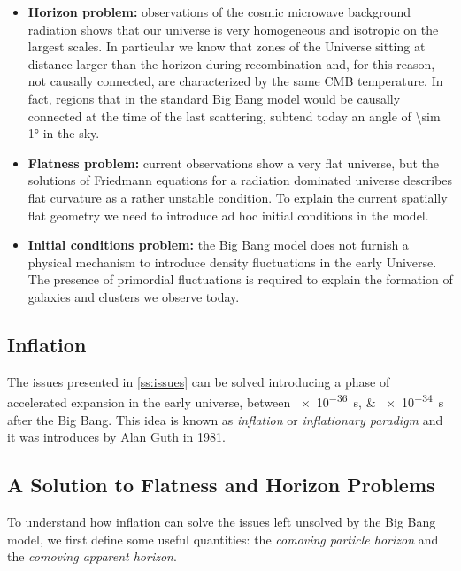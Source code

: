 \begin{itemize}
        \item \textbf{Horizon problem:} observations of the cosmic
        microwave background radiation shows that our universe is very
        homogeneous and isotropic on the largest scales. In particular we
        know that zones of the Universe sitting at distance larger than the
        horizon during recombination and, for this reason, not causally
        connected, are characterized by the same CMB temperature.
        In fact, regions that in the standard Big Bang model would be causally
        connected at the time of the last scattering, subtend today an
        angle of \ang{\sim 1} in the sky.

        \item \textbf{Flatness problem:} current observations show a very
        flat universe, but the solutions of Friedmann equations for a
        radiation dominated universe describes flat curvature as a rather
        unstable condition. To explain the current spatially flat geometry
        we need to introduce ad hoc initial conditions in the model.

        \item \textbf{Initial conditions problem:} the Big Bang model
        does not furnish a physical mechanism to introduce density
        fluctuations in the early Universe. The presence of primordial
        fluctuations is required to explain the formation of galaxies and
        clusters we observe today.
\end{itemize}

\subsection{Inflation}

The issues presented in \autoref{ss:issues} can be solved introducing a
phase of accelerated expansion in the early universe, between
\SIlist{e-36;e-34}{\second} after the Big Bang. This idea is known as
\emph{inflation} or \emph{inflationary paradigm} and it was introduces by
Alan Guth in 1981.

\subsection{A Solution to Flatness and Horizon Problems}

To understand how inflation can solve the issues left unsolved by the Big Bang
model, we first define some useful quantities: the \emph{comoving particle
horizon} and the \emph{comoving apparent horizon}.

